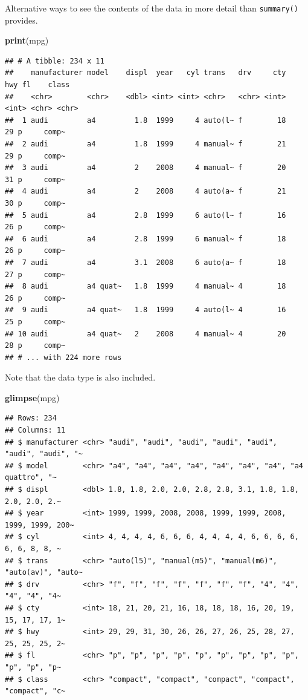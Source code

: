\documentclass[
]{book}
\newenvironment{Shaded}{\begin{snugshade}}{\end{snugshade}}
\newcommand{\KeywordTok}[1]{\textcolor[rgb]{0.13,0.29,0.53}{\textbf{#1}}}
\newcommand{\NormalTok}[1]{#1}
\begin{document}
Alternative ways to see the contents of the data in more detail than \texttt{summary()} provides.

\begin{Shaded}
\begin{Highlighting}[]
\KeywordTok{print}\NormalTok{(mpg)}
\end{Highlighting}
\end{Shaded}

\begin{verbatim}
## # A tibble: 234 x 11
##    manufacturer model    displ  year   cyl trans   drv     cty   hwy fl    class
##    <chr>        <chr>    <dbl> <int> <int> <chr>   <chr> <int> <int> <chr> <chr>
##  1 audi         a4         1.8  1999     4 auto(l~ f        18    29 p     comp~
##  2 audi         a4         1.8  1999     4 manual~ f        21    29 p     comp~
##  3 audi         a4         2    2008     4 manual~ f        20    31 p     comp~
##  4 audi         a4         2    2008     4 auto(a~ f        21    30 p     comp~
##  5 audi         a4         2.8  1999     6 auto(l~ f        16    26 p     comp~
##  6 audi         a4         2.8  1999     6 manual~ f        18    26 p     comp~
##  7 audi         a4         3.1  2008     6 auto(a~ f        18    27 p     comp~
##  8 audi         a4 quat~   1.8  1999     4 manual~ 4        18    26 p     comp~
##  9 audi         a4 quat~   1.8  1999     4 auto(l~ 4        16    25 p     comp~
## 10 audi         a4 quat~   2    2008     4 manual~ 4        20    28 p     comp~
## # ... with 224 more rows
\end{verbatim}

Note that the data type is also included.

\begin{Shaded}
\begin{Highlighting}[]
\KeywordTok{glimpse}\NormalTok{(mpg)}
\end{Highlighting}
\end{Shaded}

\begin{verbatim}
## Rows: 234
## Columns: 11
## $ manufacturer <chr> "audi", "audi", "audi", "audi", "audi", "audi", "audi", "~
## $ model        <chr> "a4", "a4", "a4", "a4", "a4", "a4", "a4", "a4 quattro", "~
## $ displ        <dbl> 1.8, 1.8, 2.0, 2.0, 2.8, 2.8, 3.1, 1.8, 1.8, 2.0, 2.0, 2.~
## $ year         <int> 1999, 1999, 2008, 2008, 1999, 1999, 2008, 1999, 1999, 200~
## $ cyl          <int> 4, 4, 4, 4, 6, 6, 6, 4, 4, 4, 4, 6, 6, 6, 6, 6, 6, 8, 8, ~
## $ trans        <chr> "auto(l5)", "manual(m5)", "manual(m6)", "auto(av)", "auto~
## $ drv          <chr> "f", "f", "f", "f", "f", "f", "f", "4", "4", "4", "4", "4~
## $ cty          <int> 18, 21, 20, 21, 16, 18, 18, 18, 16, 20, 19, 15, 17, 17, 1~
## $ hwy          <int> 29, 29, 31, 30, 26, 26, 27, 26, 25, 28, 27, 25, 25, 25, 2~
## $ fl           <chr> "p", "p", "p", "p", "p", "p", "p", "p", "p", "p", "p", "p~
## $ class        <chr> "compact", "compact", "compact", "compact", "compact", "c~
\end{verbatim}
\end{document}

